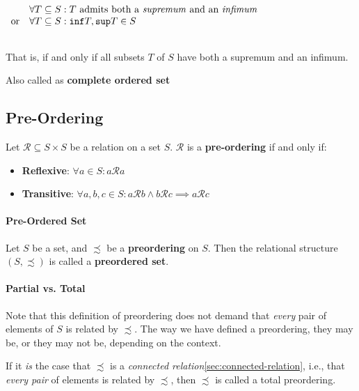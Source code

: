 \begin{math}
  \begin{array}{ll}
    \\
    & \forall T \subseteq S: T \text{ admits both a \textit{supremum} and an \textit{infimum}} \\
    \text{or} & \forall T \subseteq S: \mathtt{inf}T, \mathtt{sup}T \in S \\
    \\
  \end{array}
\end{math}

That is, if and only if all subsets $T$ of $S$ have both a supremum
and an infimum.

Also called as \textbf{complete ordered set}


\subsection{Pre-Ordering}
\label{sec:pre-ordering}

Let $\mathcal{R} \subseteq S \times S$ be a relation on a set
$S$. $\mathcal{R}$ is a \textbf{pre-ordering} if and only if:

\begin{itemize}
\item \textbf{Reflexive}: $\forall a \in S: a \mathcal{R} a $
\item \textbf{Transitive}:
  $\forall a,b,c \in S: a \mathcal{R} b \land b \mathcal{R} c \implies
  a \mathcal{R} c $
\end{itemize}

\paragraph{Pre-Ordered Set}

Let $S$ be a set, and $\precsim$ be a \textbf{preordering} on
$S$. Then the relational structure $(S, \precsim)$ is called a
\textbf{preordered set}.


\paragraph{Partial vs. Total}

Note that this definition of preordering does not demand that
\textit{every} pair of elements of $S$ is related by $\precsim$. The
way we have defined a preordering, they may be, or they may not be,
depending on the context.

If it \textit{is} the case that $\precsim$ is a \textit{connected
  relation}\ref{sec:connected-relation}, i.e., that \textit{every
  pair} of elements is related by $\precsim$, then $\precsim$ is
called a total preordering.

